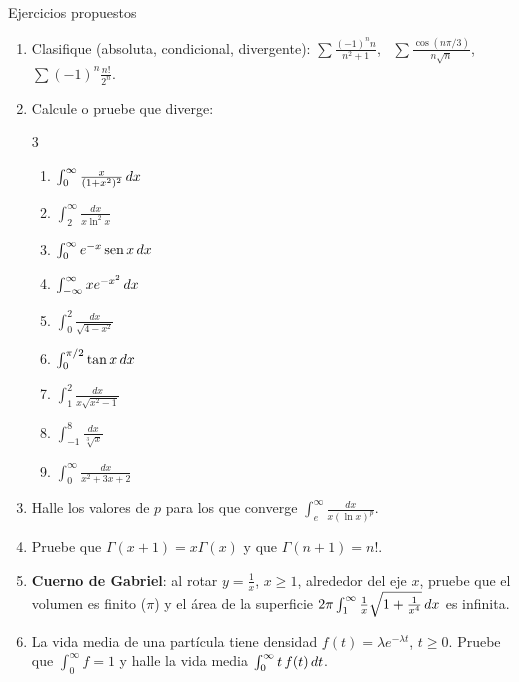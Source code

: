 \documentclass[10pt,aspectratio=169]{beamer}
\begin{document}
\begin{frame}{Ejercicios propuestos}
  \small
  \begin{ejercicio}
    \begin{enumerate}
      \item Clasifique (absoluta, condicional, divergente): $\sum\frac{(-1)^n n}{n^2+1}$, \ $\sum\frac{\cos(n\pi/3)}{n\sqrt n}$, \ $\sum(-1)^n\frac{n!}{2^n}$.
      \item Calcule o pruebe que diverge:
        \begin{multicols}{3}
        \begin{enumerate}
          \item[(a)] $\int_0^\infty\frac{x}{(1+x^2)^2}\,dx$
          \item[(b)] $\int_2^\infty\frac{dx}{x\ln^2x}$
          \item[(c)] $\int_0^\infty e^{-x}\operatorname{sen} x\,dx$
          \item[(d)] $\int_{-\infty}^\infty xe^{-x^2}\,dx$
          \item[(e)] $\int_0^2\frac{dx}{\sqrt{4-x^2}}$
          \item[(f)] $\int_0^{\pi/2}\tan x\,dx$
          \item[(g)] $\int_1^2\frac{dx}{x\sqrt{x^2-1}}$
          \item[(h)] $\int_{-1}^8\frac{dx}{\sqrt[3]x}$
          \item[(i)] $\int_0^\infty\frac{dx}{x^2+3x+2}$
        \end{enumerate}
        \end{multicols}
      \item Halle los valores de $p$ para los que converge $\int_e^\infty\frac{dx}{x(\ln x)^p}$.
      \item Pruebe que $\Gamma(x+1)=x\Gamma(x)$ y que $\Gamma(n+1)=n!$.
      \item \textbf{Cuerno de Gabriel}: al rotar $y=\frac1x$, $x\ge1$, alrededor del eje $x$, pruebe que el volumen es finito ($\pi$) y el área
        de la superficie $2\pi\int_1^\infty\frac1x\sqrt{1+\frac1{x^4}}\,dx$ es infinita.
      \item La vida media de una partícula tiene densidad $f(t)=\lambda e^{-\lambda t}$, $t\ge0$. Pruebe que $\int_0^\infty f=1$ y halle la
        vida media $\int_0^\infty t\,f(t)\,dt$.
    \end{enumerate}
  \end{ejercicio}
\end{frame}
\end{document}
